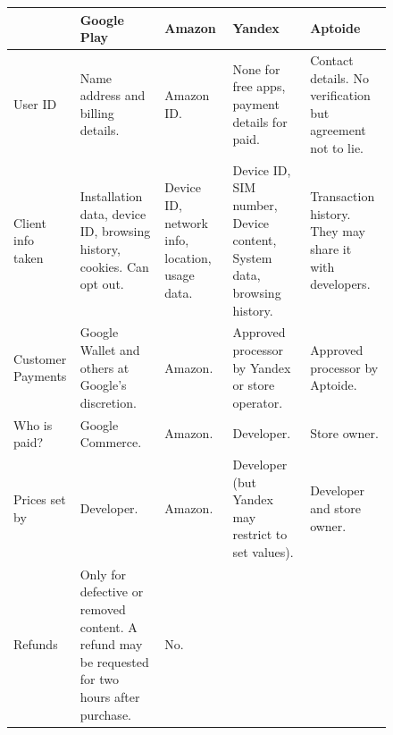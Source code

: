 \documentclass[a4paper]{scrartcl}
\begin{document}
\begin{figure}[!h]\tiny
\begin{tabulary}{\linewidth}{lLLLL}
\toprule
                     & Google Play                                                                                                                                                        & Amazon & Yandex & Aptoide \\
\midrule
User ID              & Name address and billing details.
                     & Amazon ID.
                     & None for free apps, payment details for paid.
                     & Contact details. No verification but agreement not to lie.                                                                                                        \\ \addlinespace
Client info taken    & Installation data, device ID, browsing history, cookies. Can opt out.
                     & Device ID, network info, location, usage data.
                     & Device ID, SIM number, Device content, System data, browsing history.
                     & Transaction history.  They may share it with developers.                                                                                                          \\ \addlinespace
Customer Payments    & Google Wallet and others at Google's discretion.
                     & Amazon.
                     & Approved processor by Yandex or store operator.
                     & Approved processor by Aptoide.                                                                                                                                    \\ \addlinespace
Who is paid?         & Google Commerce.
                     & Amazon.
                     & Developer.
                     & Store owner.                                                                                                                                                      \\ \addlinespace
Prices set by        & Developer.
                     & Amazon.
                     & Developer (but Yandex may restrict to set values).
                     & Developer and store owner.                                                                                                                                        \\ \addlinespace
Refunds              & Only for defective or removed content. A refund may be requested for two hours after purchase.
                     & No.

\end{tabulary}
\end{figure}
\end{document}
